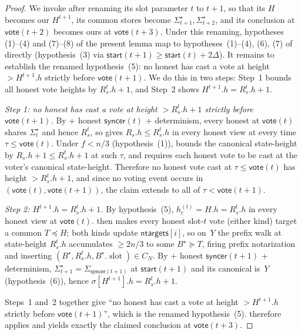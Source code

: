 \documentclass{article}
\newcommand{\slot}[0]{\ensuremath{\operatorname{\mathrm{slot}}}}
\newcommand{\ntargets}{\mathsf{ntargets}}
\newcommand{\syncer}{\mathsf{syncer}}
\newcommand{\start}{\mathsf{start}}
\newcommand{\vote}{\mathsf{vote}}
\theoremstyle{plain}
\theoremstyle{definition}
\theoremstyle{remark}
\begin{document}
\begin{proof}
We invoke  after renaming its slot parameter $t$ to $t+1$, so that its $H$ becomes our $H^{t+1}$, its common stores become $\Sigma^\star_{t+1}, \Sigma^\star_{t+2}$, and its conclusion at $\vote(t+2)$ becomes ours at $\vote(t+3)$.
Under this renaming, hypotheses (1)--(4) and (7)--(8) of the present lemma map to hypotheses~(1)--(4), (6), (7) of  directly (hypothesis~(3) via $\start(t+1) \geq \start(t) + 2\Delta$).
It remains to establish the renamed hypothesis~(5): no honest has cast a vote at height $> H^{t+1}.h$ strictly before $\vote(t+1)$.
We do this in two steps: Step~1 bounds all honest vote heights by $R_s^t.h + 1$, and Step~2 shows $H^{t+1}.h = R_s^t.h + 1$.

\emph{Step 1: no honest has cast a vote at height $> R_s^t.h + 1$ strictly before $\vote(t+1)$.}
By  + honest $\syncer(t)$ + determinism, every honest at $\vote(t)$ shares $\Sigma^\star_t$ and hence $R_s^t$, so  gives $R_s.h \leq R_s^t.h$ in every honest view at every time $\tau \leq \vote(t)$.
Under $f < n/3$ (hypothesis~(1)),  bounds the canonical state-height by $R_s.h + 1 \leq R_s^t.h + 1$ at such $\tau$, and  requires each honest vote to be cast at the voter's canonical state-height.
Therefore no honest vote cast at $\tau \leq \vote(t)$ has height $> R_s^t.h + 1$, and since no voting event occurs in $(\vote(t), \vote(t+1))$, the claim extends to all of $\tau < \vote(t+1)$.

\emph{Step 2: $H^{t+1}.h = R_s^t.h + 1$.}
By hypothesis~(5), $h_c^{(t)} = H.h = R_s^t.h$ in every honest view at $\vote(t)$.
 then makes every honest slot-$t$ vote (either kind) target a common $T \preceq H$; both kinds update $\ntargets[i]$, so on~$Y$ the prefix walk at state-height $R_s^t.h$ accumulates $\geq 2n/3$ to some $B^\star \succeq T$, firing prefix notarization and inserting $(B^\star, R_s^t.h, B^\star.\slot) \in C_N$.
By  + honest $\syncer(t+1)$ + determinism, $\Sigma^\star_{t+1} = \Sigma_{\syncer(t+1)}$ at $\start(t+1)$ and its canonical is~$Y$ (hypothesis~(6)), hence $\sigma[H^{t+1}].h = R_s^t.h + 1$.

Steps~1 and~2 together give ``no honest has cast a vote at height $> H^{t+1}.h$ strictly before $\vote(t+1)$'', which is the renamed hypothesis~(5).
 therefore applies and yields exactly the claimed conclusion at $\vote(t+3)$.
\end{proof}
\end{document}

